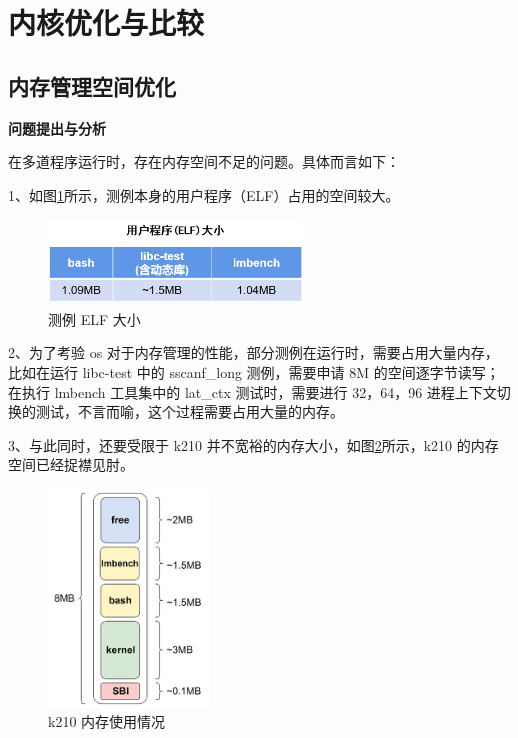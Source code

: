 \section{内核优化与比较}
\subsection{内存管理空间优化}

\textbf{问题提出与分析}

在多道程序运行时，存在内存空间不足的问题。具体而言如下：

1、如图\ref{fig:ELF}所示，测例本身的用户程序（ELF）占用的空间较大。

\begin{figure}[H]
	\centering
	\includegraphics[width=0.6\textwidth]{figures/10-04-测例ELF.jpg}
	\caption{测例 ELF 大小}
	\label{fig:ELF}
\end{figure}

2、为了考验 os 对于内存管理的性能，部分测例在运行时，需要占用大量内存，比如在运行 libc-test 中的 sscanf_long 测例，需要申请 8M 的空间逐字节读写；在执行 lmbench 工具集中的 lat_ctx 测试时，需要进行 32，64，96 进程上下文切换的测试，不言而喻，这个过程需要占用大量的内存。

3、与此同时，还要受限于 k210 并不宽裕的内存大小，如图\ref{fig:k210}所示，k210 的内存空间已经捉襟见肘。

\begin{figure}[h]
	\centering
	\includegraphics[width=0.38\textwidth]{figures/10-04-k210内存空间.jpg}
	\caption{k210 内存使用情况}
	\label{fig:k210}
\end{figure}

